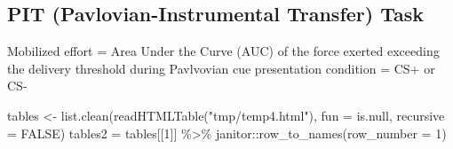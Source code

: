 \documentclass[
]{article}
\newenvironment{Shaded}{\begin{snugshade}}{\end{snugshade}}
\newcommand{\AttributeTok}[1]{\textcolor[rgb]{0.77,0.63,0.00}{#1}}
\newcommand{\ConstantTok}[1]{\textcolor[rgb]{0.00,0.00,0.00}{#1}}
\newcommand{\DecValTok}[1]{\textcolor[rgb]{0.00,0.00,0.81}{#1}}
\newcommand{\FunctionTok}[1]{\textcolor[rgb]{0.00,0.00,0.00}{#1}}
\newcommand{\NormalTok}[1]{#1}
\newcommand{\OtherTok}[1]{\textcolor[rgb]{0.56,0.35,0.01}{#1}}
\newcommand{\SpecialCharTok}[1]{\textcolor[rgb]{0.00,0.00,0.00}{#1}}
\newcommand{\StringTok}[1]{\textcolor[rgb]{0.31,0.60,0.02}{#1}}
\begin{document}
\hfill\break
\hfill\break

\hypertarget{pit-pavlovian-instrumental-transfer-task}{%
\subsection{PIT (Pavlovian-Instrumental Transfer)
Task}\label{pit-pavlovian-instrumental-transfer-task}}

Mobilized effort = Area Under the Curve (AUC) of the force exerted
exceeding the delivery threshold during Pavlvovian cue presentation
condition = CS+ or CS-

\hfill\break

\begin{Shaded}
\begin{Highlighting}[]
\NormalTok{tables }\OtherTok{\textless{}{-}} \FunctionTok{list.clean}\NormalTok{(}\FunctionTok{readHTMLTable}\NormalTok{(}\StringTok{"tmp/temp4.html"}\NormalTok{), }\AttributeTok{fun =}\NormalTok{ is.null, }\AttributeTok{recursive =} \ConstantTok{FALSE}\NormalTok{)}
\NormalTok{tables2 }\OtherTok{=}\NormalTok{ tables[[}\DecValTok{1}\NormalTok{]] }\SpecialCharTok{\%\textgreater{}\%}\NormalTok{ janitor}\SpecialCharTok{::}\FunctionTok{row\_to\_names}\NormalTok{(}\AttributeTok{row\_number =} \DecValTok{1}\NormalTok{)}


\end{Highlighting}
\end{Shaded}
\end{document}
